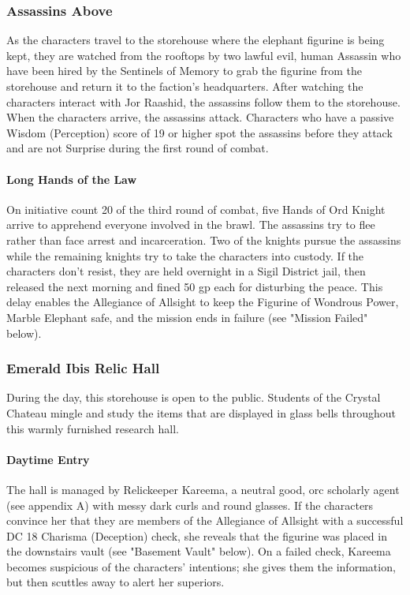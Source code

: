 \documentclass[10pt,a4paper,twoside,twocolumn,openany,nodeprecatedcode]{dndbook}
\begin{document}
\subsubsection{Assassins Above}
As the characters travel to the storehouse where the elephant figurine is being kept, they are watched from the rooftops by two lawful evil, human Assassin who have been hired by the Sentinels of Memory to grab the figurine from the storehouse and return it to the faction's headquarters. After watching the characters interact with Jor Raashid, the assassins follow them to the storehouse. When the characters arrive, the assassins attack. Characters who have a passive Wisdom (Perception) score of 19 or higher spot the assassins before they attack and are not Surprise during the first round of combat.

\paragraph{Long Hands of the Law}
On initiative count 20 of the third round of combat, five Hands of Ord Knight arrive to apprehend everyone involved in the brawl. The assassins try to flee rather than face arrest and incarceration. Two of the knights pursue the assassins while the remaining knights try to take the characters into custody. If the characters don't resist, they are held overnight in a Sigil District jail, then released the next morning and fined 50 gp each for disturbing the peace. This delay enables the Allegiance of Allsight to keep the Figurine of Wondrous Power, Marble Elephant safe, and the mission ends in failure (see "Mission Failed" below).

\subsubsection{Emerald Ibis Relic Hall}
During the day, this storehouse is open to the public. Students of the Crystal Chateau mingle and study the items that are displayed in glass bells throughout this warmly furnished research hall.

\paragraph{Daytime Entry}
The hall is managed by Relickeeper Kareema, a neutral good, orc scholarly agent (see appendix A) with messy dark curls and round glasses. If the characters convince her that they are members of the Allegiance of Allsight with a successful DC 18 Charisma (Deception) check, she reveals that the figurine was placed in the downstairs vault (see "Basement Vault" below). On a failed check, Kareema becomes suspicious of the characters' intentions; she gives them the information, but then scuttles away to alert her superiors.
\end{document}
